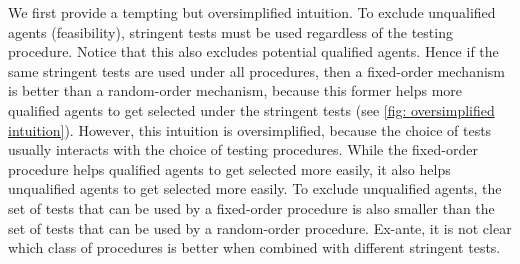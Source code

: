 We first provide a tempting but oversimplified intuition.
To exclude unqualified agents (feasibility), stringent tests must be used regardless of the testing procedure. 
Notice that this also excludes potential qualified agents.
Hence if the same stringent tests are used under all procedures, then a fixed-order mechanism is better than a random-order mechanism, because this former helps more qualified agents to get selected under the stringent tests (see \cref{fig: oversimplified intuition}).
However, this intuition is oversimplified, because the choice of tests usually interacts with the choice of testing procedures.
While the fixed-order procedure helps qualified agents to get selected more easily, it also helps unqualified agents to get selected more easily.
To exclude unqualified agents, the set of tests that can be used by a fixed-order procedure is also smaller than the set of tests that can be used by a random-order procedure.
Ex-ante, it is not clear which class of procedures is better when combined with different stringent tests.



